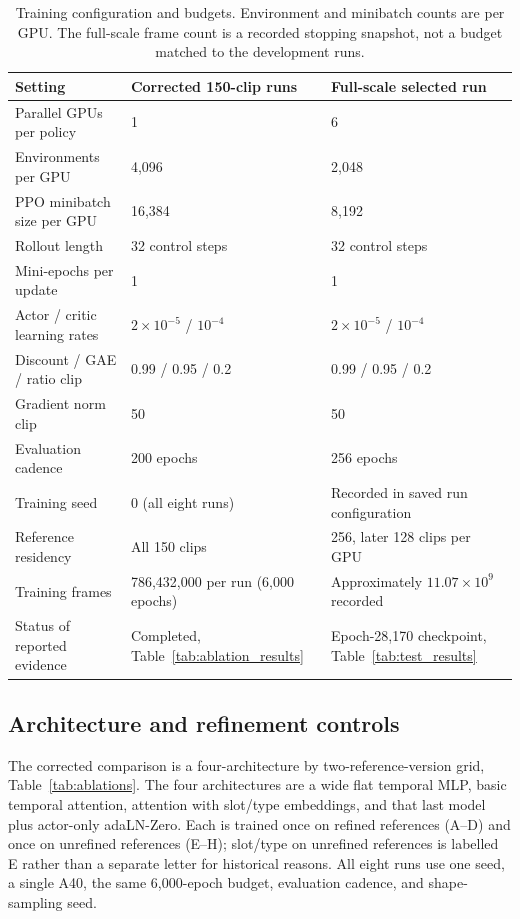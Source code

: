 \begin{table}[t]
\centering
\small
\caption{Training configuration and budgets. Environment and minibatch counts
are per GPU. The full-scale frame count is a recorded stopping snapshot,
not a budget matched to the development runs.}\label{tab:training_parameters}
\begin{tabularx}{\linewidth}{@{}lYY@{}}
\toprule
Setting & Corrected 150-clip runs & Full-scale selected run \\
\midrule
Parallel GPUs per policy & 1 & 6 \\
Environments per GPU & 4,096 & 2,048 \\
PPO minibatch size per GPU & 16,384 & 8,192 \\
Rollout length & 32 control steps & 32 control steps \\
Mini-epochs per update & 1 & 1 \\
Actor / critic learning rates &
$2\times10^{-5}$ / $10^{-4}$ & $2\times10^{-5}$ / $10^{-4}$ \\
Discount / GAE / ratio clip & 0.99 / 0.95 / 0.2 & 0.99 / 0.95 / 0.2 \\
Gradient norm clip & 50 & 50 \\
Evaluation cadence & 200 epochs & 256 epochs \\
Training seed & 0 (all eight runs) & Recorded in saved run configuration \\
Reference residency & All 150 clips & 256, later 128 clips per GPU \\
Training frames & 786,432,000 per run (6,000 epochs) & Approximately $11.07\times10^9$ recorded \\
Status of reported evidence & Completed, Table~\ref{tab:ablation_results} & Epoch-28,170 checkpoint, Table~\ref{tab:test_results} \\
\bottomrule
\end{tabularx}
\end{table}

\subsection{Architecture and refinement controls}\label{sec:ablation_design}

The corrected comparison is a four-architecture by two-reference-version grid,
Table~\ref{tab:ablations}. The four architectures are a wide flat temporal
MLP, basic temporal attention, attention with slot/type embeddings, and that
last model plus actor-only adaLN-Zero. Each is trained once on refined
references (A--D) and once on unrefined references (E--H); slot/type on
unrefined references is labelled E rather than a separate letter for
historical reasons. All eight runs use one seed, a single A40, the same
6,000-epoch budget, evaluation cadence, and shape-sampling seed.


